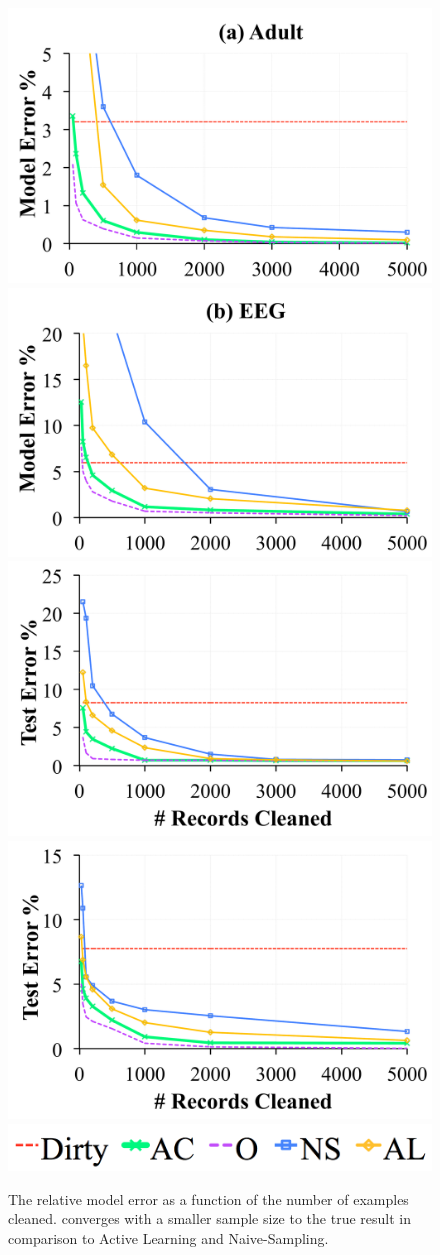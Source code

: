 \iffalse
\begin{figure}[t]
\centering\vspace{-1em}
 \includegraphics[width=0.49\columnwidth]{exp/exp3b.pdf}
  \includegraphics[width=0.49\columnwidth]{exp/exp3c.pdf}
  \includegraphics[width=0.49\columnwidth]{exp/exp3bb.pdf}
  \includegraphics[width=0.49\columnwidth]{exp/exp3cc.pdf}
  \includegraphics[width=0.5\columnwidth]{exp/legend-general.png}\vspace{-0.5em}
 \caption{ The relative model error as a function of the number of examples cleaned. \sys converges with a smaller sample size to the true result in comparison to Active Learning and Naive-Sampling. \label{prio-perf}}\vspace{-1em}
\end{figure}

